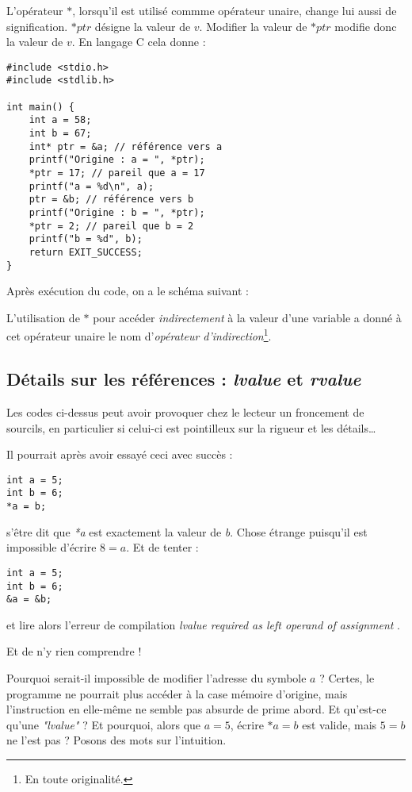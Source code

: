 \documentclass[../../../main.tex]{subfiles}
\begin{document}
L'opérateur $*$, lorsqu'il est utilisé commme opérateur unaire, change lui aussi de signification. $*ptr$ désigne la valeur de $v$. Modifier la valeur de $*ptr$ modifie donc la valeur de $v$. En langage C cela donne :
\begin{verbatim}
#include <stdio.h>
#include <stdlib.h>

int main() {
	int a = 58;
	int b = 67;
	int* ptr = &a; // référence vers a
	printf("Origine : a = ", *ptr);
	*ptr = 17; // pareil que a = 17
	printf("a = %d\n", a);
	ptr = &b; // référence vers b
	printf("Origine : b = ", *ptr);
	*ptr = 2; // pareil que b = 2
	printf("b = %d", b);
	return EXIT_SUCCESS;
}
\end{verbatim}
Après exécution du code, on a le schéma suivant :

\begin{minipage}{\textwidth}
	\begin{center}
		
	\end{center}
\end{minipage}

L'utilisation de $\ast$ pour accéder \textit{indirectement} à la valeur d'une variable a donné à cet opérateur unaire le nom d'\textit{opérateur d'indirection}\footnote{En toute originalité.}.

\subsection{Détails sur les références : \textit{lvalue} et \textit{rvalue}}
\label{sub:lvalue_et_rvalue}
Les codes ci-dessus peut avoir provoquer chez le lecteur un froncement de sourcils, en particulier si celui-ci est pointilleux sur la rigueur et les détails\dots

Il pourrait après avoir essayé ceci avec succès :
\begin{verbatim}
int a = 5;
int b = 6;
*a = b;
\end{verbatim}
s'être dit que \textit{*a} est exactement la valeur de \textit{b}. Chose étrange puisqu'il est impossible d'écrire $8 = a$. Et de tenter :
\begin{verbatim}
int a = 5;
int b = 6;
&a = &b;
\end{verbatim}
et lire alors l'erreur de compilation \textit{\og lvalue required as left operand of assignment \fg}.

Et de n'y rien comprendre !

Pourquoi serait-il impossible de modifier l'adresse du symbole $a$ ? Certes, le programme ne pourrait plus accéder à la case mémoire d'origine, mais l'instruction en elle-même ne semble pas absurde de prime abord. Et qu'est-ce qu'une \textit{"lvalue"} ? Et pourquoi, alors que $a = 5$, écrire $*a = b$ est valide, mais $5 = b$ ne l'est pas ?\newline
Posons des mots sur l'intuition.
\end{document}
